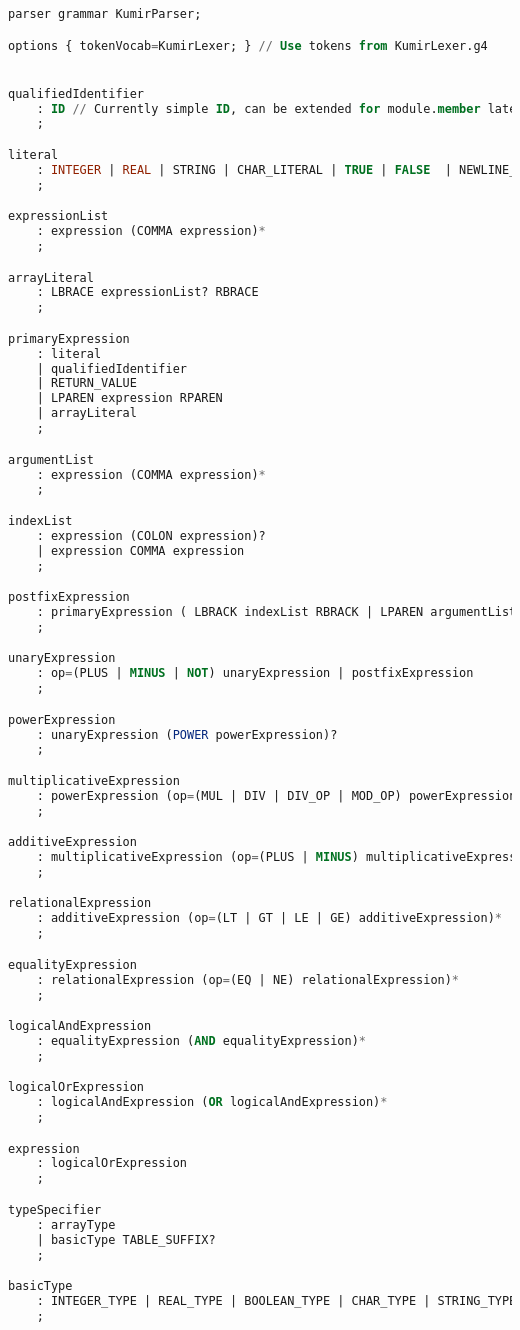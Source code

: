 \begin{lstlisting}[language=sql, caption={Парсер грамматики в формате ANTRL}, label=lst:kafka-click2]
parser grammar KumirParser;

options { tokenVocab=KumirLexer; } // Use tokens from KumirLexer.g4


qualifiedIdentifier
    : ID // Currently simple ID, can be extended for module.member later
    ;

literal
    : INTEGER | REAL | STRING | CHAR_LITERAL | TRUE | FALSE  | NEWLINE_CONST
    ;

expressionList
    : expression (COMMA expression)*
    ;

arrayLiteral
    : LBRACE expressionList? RBRACE
    ;

primaryExpression 
    : literal
    | qualifiedIdentifier
    | RETURN_VALUE
    | LPAREN expression RPAREN 
    | arrayLiteral
    ;

argumentList 
    : expression (COMMA expression)*
    ;

indexList
    : expression (COLON expression)? 
    | expression COMMA expression
    ;

postfixExpression
    : primaryExpression ( LBRACK indexList RBRACK | LPAREN argumentList? RPAREN )*
    ;

unaryExpression
    : op=(PLUS | MINUS | NOT) unaryExpression | postfixExpression
    ;

powerExpression
    : unaryExpression (POWER powerExpression)?
    ;

multiplicativeExpression
    : powerExpression (op=(MUL | DIV | DIV_OP | MOD_OP) powerExpression)*
    ;

additiveExpression
    : multiplicativeExpression (op=(PLUS | MINUS) multiplicativeExpression)*
    ;

relationalExpression
    : additiveExpression (op=(LT | GT | LE | GE) additiveExpression)*
    ;

equalityExpression
    : relationalExpression (op=(EQ | NE) relationalExpression)*
    ;

logicalAndExpression
    : equalityExpression (AND equalityExpression)*
    ;

logicalOrExpression
    : logicalAndExpression (OR logicalAndExpression)*
    ;

expression
    : logicalOrExpression
    ;

typeSpecifier 
    : arrayType
    | basicType TABLE_SUFFIX?
    ;

basicType
    : INTEGER_TYPE | REAL_TYPE | BOOLEAN_TYPE | CHAR_TYPE | STRING_TYPE
    ;


\end{lstlisting}
